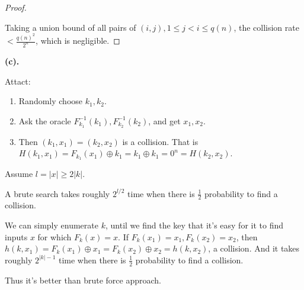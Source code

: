 \documentclass[a4paper]{article}
\newenvironment{problem}[2][Problem]{\begin{trivlist}
\item[\hskip \labelsep {\bfseries #1}\hskip \labelsep {\bfseries #2.}]}{\end{trivlist}}
\begin{document}
\begin{problem}{6.19}
\begin{proof}
\begin{itemize}
\end{itemize}\par
Taking a union bound of all pairs of $(i,j),1\le j<i\le q(n)$, the collision rate $<\frac{q(n)^2}{2^n}$, which is negligible.
\end{proof}
\par\vspace{3ex}
\textbf{(c).}\par
Attact:\begin{enumerate}
    \item Randomly choose $k_1,k_2$.
    \item Ask the oracle $F_{k_1}^{-1}(k_1),F_{k_2}^{-1}(k_2)$, and get $x_1,x_2$.
    \item Then $(k_1,x_1)=(k_2,x_2)$ is a collision. That is $H(k_1,x_1)=F_{k_1}(x_1)\oplus k_1=k_1\oplus k_1=0^n=H(k_2,x_2)$.
\end{enumerate}
\end{problem}

\begin{problem}{6.21}
Assume $l=|x|\ge2|k|$.\par
A brute search takes roughly $2^{l/2}$ time when there is $\frac12$ probability to find a collision. \par
We can simply enumerate $k$, until we find the key that it's easy for it to find inputs $x$ for which $F_k(x)=x$. If $F_k(x_1)=x_1,F_k(x_2)=x_2$, then $h(k,x_1)=F_k(x_1)\oplus x_1=F_k(x_2)\oplus x_2=h(k,x_2)$, a collision. And it takes roughly $2^{|k|-1}$ time when there is $\frac12$ probability to find a collision. \par
Thus it's better than brute force approach.

\end{problem}
\end{document}
